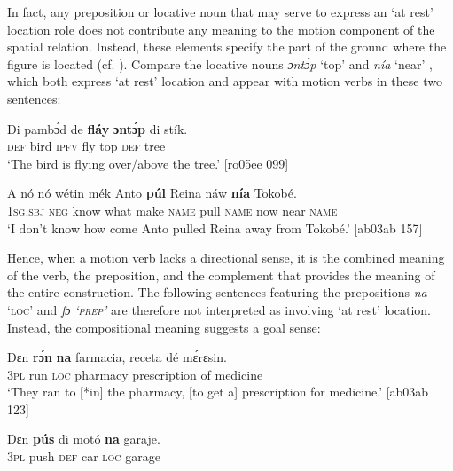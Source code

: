 In fact, any preposition or locative noun that may serve to express an ‘at rest’ location role does not contribute any meaning to the motion component of the spatial relation. Instead, these elements specify the part of the ground where the figure is located (cf. \citealt{Essegbey2005}). Compare the locative nouns \textit{ɔntɔ́p} ‘top’  and \textit{nía} ‘near’ , which both express ‘at rest’ location and appear with motion verbs in these two sentences: 



\ea%
    \label{ex:key:970}
    \gll Di  pambɔ́d  de  \textbf{fláy}  \textbf{ɔntɔ́p}  di  stík.\\
\textsc{def}  bird    \textsc{ipfv}  fly  top    \textsc{def}  tree\\

\glt ‘The bird is flying over/above the tree.’ [ro05ee 099]
\z


\ea%
    \label{ex:key:971}
    \gll A    nó  nó    wétin  mék    Anto  \textbf{púl}
Reina  náw    \textbf{nía}    Tokobé.\\
\textsc{1sg.sbj}  \textsc{neg}  know  what  make  \textsc{name}  pull
\textsc{name}  now    near    \textsc{name}\\

\glt ‘I don’t know how come Anto pulled Reina away from Tokobé.’ [ab03ab 157]
\z

Hence, when a motion verb lacks a directional sense, it is the combined meaning of the verb, the preposition, and the complement that provides the meaning of the entire construction. The following sentences featuring the prepositions \textit{na} ‘\textsc{loc}’ and \textit{fɔ} \textit{\textup{‘}}\textit{\textsc{prep}}\textit{\textup{’}} are therefore not interpreted as involving ‘at rest’ location. Instead, the compositional meaning suggests a goal sense: 


\ea%
    \label{ex:key:972}
    \gll Dɛn    \textbf{rɔ́n}    \textbf{na}  farmacia,  receta    dé  mɛ́rɛsin.\\
\textsc{3pl}    run    \textsc{loc}  pharmacy  prescription  of  medicine\\

\glt ‘They ran to [*in] the pharmacy, [to get a] prescription for medicine.’ [ab03ab 123]
\z


\ea%
    \label{ex:key:973}
    \gll Dɛn  \textbf{pús}    di  motó  \textbf{na} garaje.\\
\textsc{3pl}  push  \textsc{def}  car    \textsc{loc}  garage\\

